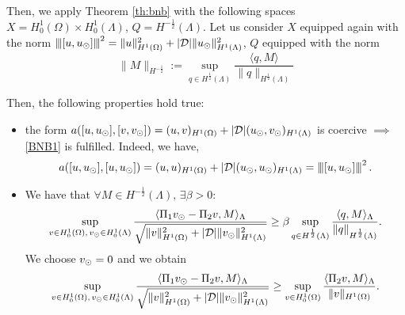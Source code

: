 Then, we apply Theorem \ref{th:bnb} with the following spaces $X=H^1_0(\Omega) \times H^1_0(\Lambda)$, $Q=H^{-\frac 12}(\Lambda)$.
Let us consider $X$ equipped again with the norm ${\left\vert\kern-0.25ex\left\vert\kern-0.25ex\left\vert [u,u_{\odot} ] \right\vert\kern-0.25ex\right\vert\kern-0.25ex\right\vert}^2=\|u\|^2_{H^1(\Omega)} + |\mathcal{D}|\|u_{\odot}\|^2_{H^1(\Lambda)}$, 
$Q$ equipped with the norm
\begin{equation*}
\|M \|_{H^{-\frac 12}} := \sup_{q\in H^{\frac 12}(\Lambda)}\frac{\langle q, M\rangle}{\|q\|_{H^{\frac 12}(\Lambda)}}
\end{equation*}

Then, the following properties hold true:
\begin{itemize}
\item the form $a([u,\ud], [v,\vd])= (u,v)_{H^1(\Omega)} + |{\cal D}|(\ud,\vd)_{H^1(\Lambda)}$ is coercive 
$\implies$ \eqref{BNB1} is fulfilled. Indeed, we have,
\begin{equation*}
a([u,\ud], [u,\ud])= (u,u)_{H^1(\Omega)} + |{\cal D}|(\ud,\ud)_{H^1(\Lambda)} = \vertiii{[u,\ud]}^2\,.
\end{equation*}

\item We have that $\forall M \in H^{-\frac 12}(\Lambda),\, \exists \beta >0$:
\begin{equation*}
\sup _{v\in H^1_0(\Omega),\, v_{\odot} \in H^1_0(\Lambda)} \frac{ \langle  \Pi_1 v_{\odot} - \Pi_2 v, M \rangle_\Lambda}{\sqrt{\|v\|^2_{H^1(\Omega)}+|\mathcal{D}| \|v_{\odot} \|^2_{H^1(\Lambda)}}}
\geq \beta \sup_{q\in H^{\frac 12}(\Lambda)}\frac{\langle q, M\rangle_\Lambda}{\|q\|_{H^{\frac 12}(\Lambda)}}.
\end{equation*}
We choose $v_{\odot}=0$ and we obtain
\begin{equation*}
\sup _{v\in H^1_0(\Omega),\, v_{\odot} \in H^1_0(\Lambda)} \frac{ \langle  \Pi_1 v_{\odot} - \Pi_2 v, M \rangle_\Lambda}{\sqrt{\|v\|^2_{H^1(\Omega)}+|\mathcal{D}|\|v_{\odot} \|^2_{H^1(\Lambda)}}}
\geq \sup _{v\in H^1_0(\Omega)} \frac{ \langle \Pi_2 v, M \rangle_\Lambda}{\|v\|_{H^1(\Omega)}}. 
\end{equation*}


\end{itemize}
